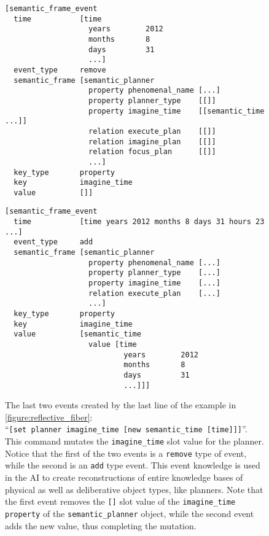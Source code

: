 \begin{figure}[h]
\centering
{\small
\begin{Verbatim}[frame=single]
[semantic_frame_event
  time           [time
                   years        2012
                   months       8
                   days         31
                   ...]
  event_type     remove
  semantic_frame [semantic_planner
                   property phenomenal_name [...]
                   property planner_type    [[]]
                   property imagine_time    [[semantic_time ...]]
                   relation execute_plan    [[]]
                   relation imagine_plan    [[]]
                   relation focus_plan      [[]]
                   ...]
  key_type       property
  key            imagine_time
  value          []]
\end{Verbatim}
\begin{Verbatim}[frame=single]
[semantic_frame_event
  time           [time years 2012 months 8 days 31 hours 23 ...]
  event_type     add
  semantic_frame [semantic_planner
                   property phenomenal_name [...]
                   property planner_type    [...]
                   property imagine_time    [...]
                   relation execute_plan    [...]
                   ...]
  key_type       property
  key            imagine_time
  value          [semantic_time
                   value [time
                           years        2012
                           months       8
                           days         31
                           ...]]]
\end{Verbatim}
}
\caption[The last two events created by the last line of the example
  in {\mbox{\autoref{figure:reflective_fiber}}}.]{The last two events
  created by the last line of the example in
  {\mbox{\autoref{figure:reflective_fiber}}}:
  ``{\tt{[set~planner~imagine\_time~[new~semantic\_time~[time]]]}}''. This
  command mutates the {\tt{imagine\_time}} slot value for the planner.
  Notice that the first of the two events is a {\tt{remove}} type of
  event, while the second is an {\tt{add}} type event.  This event
  knowledge is used in the AI to create reconstructions of entire
  knowledge bases of physical as well as deliberative object types,
  like planners.  Note that the first event removes the {\tt{[]}} slot
  value of the {\tt{imagine\_time}} {\tt{property}} of the
  {\tt{semantic\_planner}} object, while the second event adds the new
  value, thus completing the mutation.}
\label{figure:remove_add_set_events}
\end{figure}

